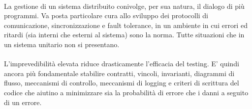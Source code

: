 \documentclass{article}
\begin{document}
\paragraph{} La gestione di un sistema distribuito conivolge, per sua natura, il dialogo di più programmi. Va posta particolare cura allo sviluppo dei protocolli di comunicazione, sincronizzazione e fault tolerance, in un ambiente in cui errori ed ritardi (sia interni che esterni al sistema) sono la norma. Tutte situazioni che in un sistema unitario non si presentano. 

\paragraph{} L'imprevedibilità elevata riduce drasticamente l'efficacia del testing. E' quindi ancora più fondamentale stabilire contratti, vincoli, invarianti, diagrammi di flusso, meccanismi di controllo, meccanismi di logging e criteri di scrittura del codice che aiutino a minimizzare sia la probabilità di errore che i danni a seguito di un errore. 



\end{document}
